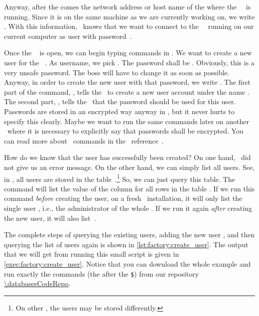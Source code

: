 Anyway, after the  comes the network address or host name of the where the \postgresql\ \server\ is running.
Since it is on the same machine as we are currently working on, we write .
With this information, \psql\ knows that we want to connect to the \postgresql\ \server\ running on our current computer as user  with password~.%
%
\begin{sloppypar}%
Once the \psql\  is open, we can begin typing commands in \sql.
We want to create a new user for the \psql\ \server.
As username, we pick .
The password shall be .
Obviously, this is a very unsafe password.
The boss will have to change it as soon as possible.
Anyway, in order to create the new user with that password, we write .
The first part of the command, , tells the \server\ to create a new user account under the name .
The second part, , tells the \server\ that the password  should be used for this user.
Passwords are stored in an encrypted way anyway in \postgresql, but it never hurts to specify this clearly.
Maybe we want to run the same commands later on another \dbms\ where it is necessary to explicitly say that passwords shall be encrypted.
You can read more about \sql\ commands in the \postgresql\ reference~\cite{PGDG:PD:SC}.%
\end{sloppypar}%
%
How do we know that the user  has successfully been created?
On one hand, \psql\ did not give us an error message.
On the other hand, we can simply list all users.
See, in \postgresql, all users are stored in the table~.\footnote{%
On other , the users may be stored differently.}
So, we can just query this table.
The \sql{} command  will list the value of the column  for all rows in the table .
If we run this command \emph{before} creating the user, on a fresh \postgresql\ installation, it will only list the single user , i.e., the administrator of the whole \dbms.
If we run it again \emph{after} creating the new user, it will also list~.

The complete steps of querying the existing users, adding the new user , and then querying the list of users again is shown in \cref{lst:factory:create_user}.
The output that we will get from running this small script is given in \cref{exec:factory:create_user}.
Notice that you can download the whole example and run exactly the commands (the {\color{listing-tool-command}{red text}} after the {\color{listing-tool-command}\texttt{\$}}) from our repository \url{\databasesCodeRepo}.

